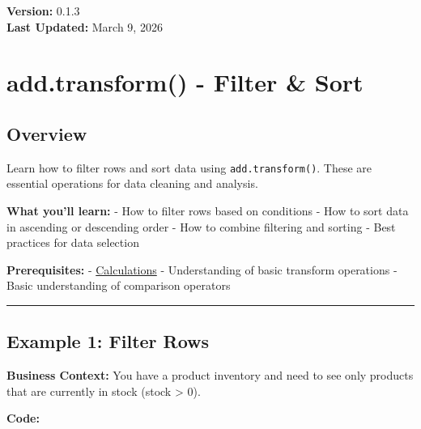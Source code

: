 \documentclass[
  letterpaper,
]{scrbook}
\begin{document}
\textbf{Version:} 0.1.3\\
\textbf{Last Updated:} March 9, 2026

\chapter{add.transform() - Filter \&
Sort}\label{add.transform---filter-sort}

\section{Overview}\label{overview-6}

Learn how to filter rows and sort data using \texttt{add.transform()}.
These are essential operations for data cleaning and analysis.

\textbf{What you'll learn:} - How to filter rows based on conditions -
How to sort data in ascending or descending order - How to combine
filtering and sorting - Best practices for data selection

\textbf{Prerequisites:} -
\href{examples-transform-01-calc.html}{Calculations} - Understanding of
basic transform operations - Basic understanding of comparison operators

\begin{center}\rule{0.5\linewidth}{0.5pt}\end{center}

\section{Example 1: Filter Rows}\label{example-1-filter-rows}

\textbf{Business Context:} You have a product inventory and need to see
only products that are currently in stock (stock \textgreater{} 0).

\textbf{Code:}
\end{document}
